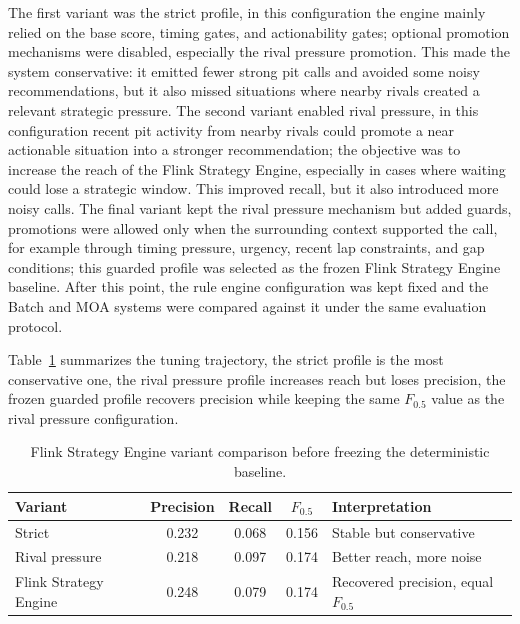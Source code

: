 The first variant was the strict profile, in this configuration the engine mainly relied on the base score, timing gates, and actionability gates; optional promotion
mechanisms were disabled, especially the rival pressure promotion. This made the system conservative: it emitted fewer strong pit calls and avoided some noisy recommendations,
but it also missed situations where nearby rivals created a relevant strategic pressure.
The second variant enabled rival pressure, in this configuration recent pit activity from nearby rivals could promote a near actionable situation into a stronger
recommendation; the objective was to increase the reach of the Flink Strategy Engine, especially in cases where waiting could lose a strategic window. This improved recall, but
it also introduced more noisy calls.
The final variant kept the rival pressure mechanism but added guards, promotions were allowed only when the surrounding context supported the call, for example through
timing pressure, urgency, recent lap constraints, and gap conditions; this guarded profile was selected as the frozen Flink Strategy Engine baseline. After this point, the
rule engine configuration was kept fixed and the Batch and MOA systems were compared against it under the same evaluation protocol.

Table~\ref{tab:flink_strategy_engine_freeze} summarizes the tuning trajectory, the strict profile is the most conservative one, the rival pressure profile increases reach
but loses precision, the frozen guarded profile recovers precision while keeping the same $F_{0.5}$ value as the rival pressure configuration.

\begin{table}[htbp]
    \centering
    \caption{Flink Strategy Engine variant comparison before freezing the deterministic baseline.}
    \label{tab:flink_strategy_engine_freeze}
    \begin{tabular}{lcccl}
        \toprule
        Variant               & Precision & Recall & $F_{0.5}$ & Interpretation                       \\
        \midrule
        Strict                & 0.232     & 0.068  & 0.156     & Stable but conservative              \\
        Rival pressure        & 0.218     & 0.097  & 0.174     & Better reach, more noise             \\
        Flink Strategy Engine & 0.248     & 0.079  & 0.174     & Recovered precision, equal $F_{0.5}$ \\
        \bottomrule
    \end{tabular}
\end{table}
\FloatBarrier

